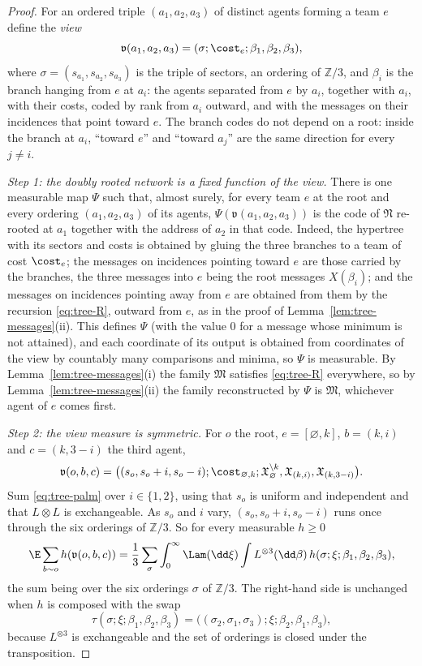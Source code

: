 \begin{proof}
For an ordered triple $(a_1,a_2,a_3)$ of distinct agents forming a team $e$ define the
\emph{view}
\[
  \mathfrak{v}(a_1,a_2,a_3)=(\sigma;\cost_e;\beta_1,\beta_2,\beta_3),
\]
where $\sigma=(s_{a_1},s_{a_2},s_{a_3})$ is the triple of sectors, an ordering of
$\mathbb{Z}/3$, and $\beta_i$ is the branch hanging from $e$ at $a_i$: the agents separated
from $e$ by $a_i$, together with $a_i$, with their costs, coded by rank from $a_i$ outward, and
with the messages on their incidences that point toward $e$. The branch codes do not depend
on a root: inside the branch at $a_i$, ``toward $e$'' and ``toward $a_j$'' are the same
direction for every $j\neq i$.

\emph{Step 1: the doubly rooted network is a fixed function of the view.} There is one
measurable map $\Psi$ such that, almost surely, for every team $e$ at the root and every
ordering $(a_1,a_2,a_3)$ of its agents, $\Psi(\mathfrak{v}(a_1,a_2,a_3))$ is the code of
$\mathfrak{N}$ re-rooted at $a_1$ together with the address of $a_2$ in that code. Indeed, the
hypertree with its sectors and costs is obtained by gluing the three branches to a team of
cost $\cost_e$; the messages on incidences pointing toward $e$ are those carried by the
branches, the three messages into $e$ being the root messages $X(\beta_i)$; and the messages on
incidences pointing away from $e$ are obtained from them by the recursion \eqref{eq:tree-R},
outward from $e$, as in the proof of Lemma~\ref{lem:tree-messages}(ii). This defines $\Psi$
(with the value $0$ for a message whose minimum is not attained), and each coordinate of its
output is obtained from coordinates of the view by countably many comparisons and minima, so
$\Psi$ is measurable.
By Lemma~\ref{lem:tree-messages}(i) the family $\mathfrak{M}$ satisfies \eqref{eq:tree-R}
everywhere, so by Lemma~\ref{lem:tree-messages}(ii) the family reconstructed by $\Psi$ is
$\mathfrak{M}$, whichever agent of $e$ comes first.

\emph{Step 2: the view measure is symmetric.} For $o$ the root, $e=[\varnothing,k]$, $b=(k,i)$
and $c=(k,3-i)$ the third agent,
\[
  \mathfrak{v}(o,b,c)=\bigl((s_o,s_o+i,s_o-i);\cost_{\varnothing,k};
     \mathfrak{X}_\varnothing^{\setminus k},\mathfrak{X}_{(k,i)},\mathfrak{X}_{(k,3-i)}\bigr).
\]
Sum \eqref{eq:tree-palm} over $i\in\{1,2\}$, using that $s_o$ is uniform and independent and
that $L\otimes L$ is exchangeable. As $s_o$ and $i$ vary, $(s_o,s_o+i,s_o-i)$ runs once through
the six orderings of $\mathbb{Z}/3$. So for every measurable $h\ge0$
\[
  \E\sum_{b\sim o}h(\mathfrak{v}(o,b,c))
  =\frac13\sum_{\sigma}\int_0^\infty\Lam(\dd\xi)\int L^{\otimes3}(\dd\beta)\,
     h(\sigma;\xi;\beta_1,\beta_2,\beta_3),
\]
the sum being over the six orderings $\sigma$ of $\mathbb{Z}/3$. The right-hand side is
unchanged when $h$ is composed with the swap
\[
  \tau(\sigma;\xi;\beta_1,\beta_2,\beta_3)=\bigl((\sigma_2,\sigma_1,\sigma_3);\xi;\beta_2,\beta_1,\beta_3\bigr),
\]
because $L^{\otimes3}$ is exchangeable and the set of orderings is closed under the
transposition.


\end{proof}
